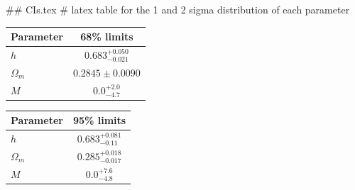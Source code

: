 ## CIs.tex
# latex table for the 1 and 2 sigma distribution of each parameter

\begin{tabular} { l  c}
 Parameter &  68\% limits\\
\hline
{\boldmath$h              $} & $0.683^{+0.050}_{-0.021}   $\\
{\boldmath$\Omega_m       $} & $0.2845\pm 0.0090          $\\
{\boldmath$M              $} & $0.0^{+2.0}_{-4.7}         $\\
\hline
\end{tabular}

\begin{tabular} { l  c}
 Parameter &  95\% limits\\
\hline
{\boldmath$h              $} & $0.683^{+0.081}_{-0.11}    $\\
{\boldmath$\Omega_m       $} & $0.285^{+0.018}_{-0.017}   $\\
{\boldmath$M              $} & $0.0^{+7.6}_{-4.8}         $\\
\hline
\end{tabular}
